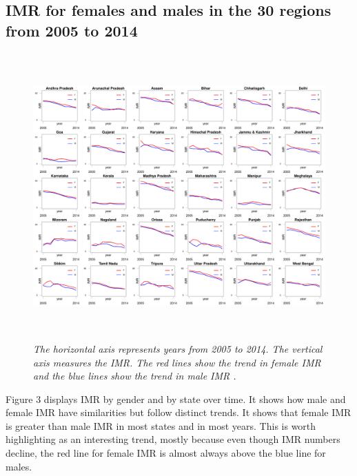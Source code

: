\documentclass{article}
\begin{document}
\subsection{IMR for females and males in the 30 regions from 2005 to 2014}
\begin{figure}[H]
   \begin{center}
   \includegraphics[height = 11cm, width = 15cm]{fem_mal.pdf}
   \end{center}
   \caption{\emph{The horizontal axis represents years from 2005 to 2014. The vertical axis measures the IMR. The red lines show the trend in female IMR and the blue lines show the trend in male IMR .}}
\end{figure}
 
Figure 3 displays IMR by gender and by state over time.  It shows how male and female IMR have similarities but follow distinct trends. It shows that female IMR is greater than male IMR in most states and in most years. This is worth highlighting as an interesting trend, mostly because even though IMR numbers decline, the red line for female IMR is almost always above the blue line for males.
\end{document}
